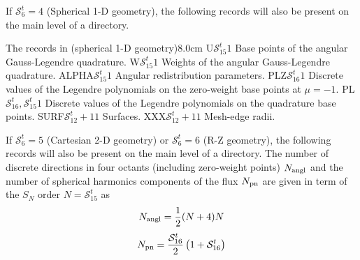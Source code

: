 If $\mathcal{S}^{t}_{6}=4$ (Spherical 1-D geometry), the following records will also be present on the main level of a 
directory.

\begin{DescriptionEnregistrement}{The  records in
 (spherical 1-D geometry)}{8.0cm}
\RealEnr
  {U}{$\mathcal{S}^{t}_{15}$}{$1$}
  {Base points of the angular Gauss-Legendre quadrature.} 
\RealEnr
  {W}{$\mathcal{S}^{t}_{15}$}{$1$}
  {Weights of the angular Gauss-Legendre quadrature.} 
\RealEnr
  {ALPHA}{$\mathcal{S}^{t}_{15}$}{$1$}
  {Angular redistribution parameters.} 
\RealEnr
  {PLZ}{$\mathcal{S}^{t}_{16}$}{$1$}
  {Discrete values of the Legendre polynomials on the zero-weight base points at $\mu=-1$.} 
\RealEnr
  {PL}{$\mathcal{S}^{t}_{16},\mathcal{S}^{t}_{15}$}{$1$}
  {Discrete values of the Legendre polynomials on the quadrature base points.} 
\RealEnr
  {SURF}{$\mathcal{S}^{t}_{12}+1$}{$1$}
  {Surfaces.} 
\RealEnr
  {XXX}{$\mathcal{S}^{t}_{12}+1$}{$1$}
  {Mesh-edge radii.} 
\end{DescriptionEnregistrement}

If $\mathcal{S}^{t}_{6}=5$ (Cartesian 2-D geometry) or $\mathcal{S}^{t}_{6}=6$ (R-Z geometry), the following records will also be present on the main level of a 
directory. The number of discrete directions in four octants (including zero-weight points) $N_{\rm angl}$ and the number of spherical harmonics components of the flux $N_{\rm pn}$
are given in term of the $S_N$ order $N=\mathcal{S}^{t}_{15}$ as
$$
N_{\rm angl}={1\over 2}(N+4)N
$$
$$
N_{\rm pn}={\mathcal{S}^{t}_{16}\over 2}\left( 1+\mathcal{S}^{t}_{16}\right)
$$

